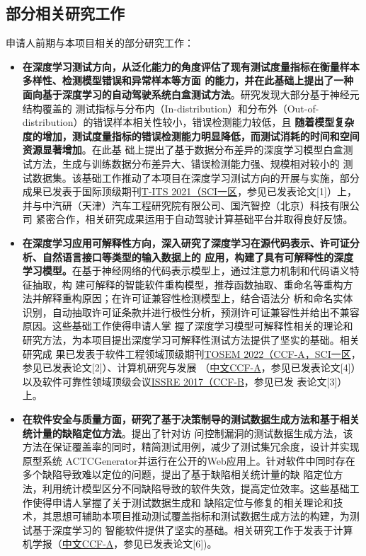 \documentclass[a4paper,zihao=-4]{article}
\begin{document}
\subsection{部分相关研究工作}


申请人前期与本项目相关的部分研究工作：

\begin{itemize}
	\item \textbf{在深度学习测试方向，从泛化能力的角度评估了现有测试度量指标在衡量样本多样性、检测模型错误和异常样本等方面
		      的能力，并在此基础上提出了一种面向基于深度学习的自动驾驶系统白盒测试方法}。研究发现大部分基于神经元结构覆盖的
	      测试指标与分布内（In-distribution）和分布外（Out-of-distribution）的错误样本相关性较小，错误检测能力较低，且
	      \textbf{随着模型复杂度的增加，测试度量指标的错误检测能力明显降低，而测试消耗的时间和空间资源显著增加}。在此基
	      础上提出了基于数据分布差异的深度学习模型白盒测试方法，生成与训练数据分布差异大、错误检测能力强、规模相对较小的
	      测试数据集。该基础工作推动了本项目在深度学习测试方向的开展与实施，部分成果已发表于国际顶级期刊\underline{T-ITS
		      2021（SCI一区}，参见已发表论文[1]）上，并与中汽研（天津）汽车工程研究院有限公司、国汽智控（北京）科技有限公司
	      紧密合作，相关研究成果运用于自动驾驶计算基础平台并取得良好反馈。

	\item \textbf{在深度学习应用可解释性方向，深入研究了深度学习在源代码表示、许可证分析、自然语言接口等类型的输入数据上的
		      应用，构建了具有可解释性的深度学习模型。}在基于神经网络的代码表示模型上，通过注意力机制和代码语义特征抽取，构
	      建可解释的智能软件重构模型，推荐函数抽取、重命名等重构方法并解释重构原因；在许可证兼容性检测模型上，结合语法分
	      析和命名实体识别，自动抽取许可证条款并进行极性分析，预测许可证兼容性并给出不兼容原因。这些基础工作使得申请人掌
	      握了深度学习模型可解释性相关的理论和研究方法，为本项目提出深度学习可解释性测试方法提供了坚实的基础。相关研究成
	      果已发表于软件工程领域顶级期刊\underline{TOSEM 2022（CCF-A，SCI一区}，参见已发表论文[2]）、计算机研究与发展
	      （\underline{中文CCF-A}，参见已发表论文[4]）以及软件可靠性领域顶级会议\underline{ISSRE 2017（CCF-B}，参见已发
	      表论文[3]）上。

	\item \textbf{在软件安全与质量方面，研究了基于决策制导的测试数据生成方法和基于相关统计量的缺陷定位方法}。提出了针对访
	      问控制漏洞的测试数据生成方法，该方法在保证覆盖率的同时，精简测试用例，减少了测试集冗余度，设计并实现原型系统
	      ACTCGenerator并运行在公开的Web应用上。针对软件中同时存在多个缺陷导致难以定位的问题，提出了基于缺陷相关统计量的缺
	      陷定位方法，利用统计模型区分不同缺陷导致的软件失效，提高定位效率。这些基础工作使得申请人掌握了关于测试数据生成和
	      缺陷定位与修复的相关理论和技术，其思想可辅助本项目推动测试覆盖指标和测试数据生成方法的构建，为测试基于深度学习的
	      智能软件提供了坚实的基础。相关研究工作于发表于计算机学报（\underline{中文CCF-A}，参见已发表论文[6])。
\end{itemize}
\end{document}
